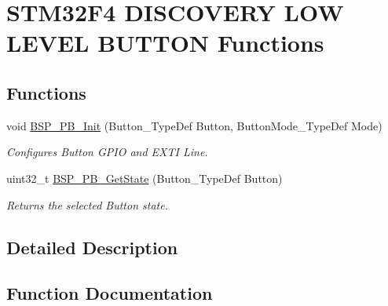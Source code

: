 \hypertarget{group___s_t_m32_f4___d_i_s_c_o_v_e_r_y___l_o_w___l_e_v_e_l___b_u_t_t_o_n___functions}{}\section{S\+T\+M32\+F4 D\+I\+S\+C\+O\+V\+E\+RY L\+OW L\+E\+V\+EL B\+U\+T\+T\+ON Functions}
\label{group___s_t_m32_f4___d_i_s_c_o_v_e_r_y___l_o_w___l_e_v_e_l___b_u_t_t_o_n___functions}
\subsection*{Functions}
\begin{DoxyCompactItemize}
\item 
void \mbox{\hyperlink{group___s_t_m32_f4___d_i_s_c_o_v_e_r_y___l_o_w___l_e_v_e_l___b_u_t_t_o_n___functions_gaeece1cd3a2156a50bfa81638a27a1143}{B\+S\+P\+\_\+\+P\+B\+\_\+\+Init}} (Button\+\_\+\+Type\+Def Button, Button\+Mode\+\_\+\+Type\+Def Mode)
\begin{DoxyCompactList}\small\item\em Configures Button G\+P\+IO and E\+X\+TI Line. \end{DoxyCompactList}\item 
uint32\+\_\+t \mbox{\hyperlink{group___s_t_m32_f4___d_i_s_c_o_v_e_r_y___l_o_w___l_e_v_e_l___b_u_t_t_o_n___functions_ga8f0978b6cffda9c67266ddfdb3a0abf7}{B\+S\+P\+\_\+\+P\+B\+\_\+\+Get\+State}} (Button\+\_\+\+Type\+Def Button)
\begin{DoxyCompactList}\small\item\em Returns the selected Button state. \end{DoxyCompactList}\end{DoxyCompactItemize}


\subsection{Detailed Description}


\subsection{Function Documentation}
\mbox{\label{group___s_t_m32_f4___d_i_s_c_o_v_e_r_y___l_o_w___l_e_v_e_l___b_u_t_t_o_n___functions_ga8f0978b6cffda9c67266ddfdb3a0abf7}} 
